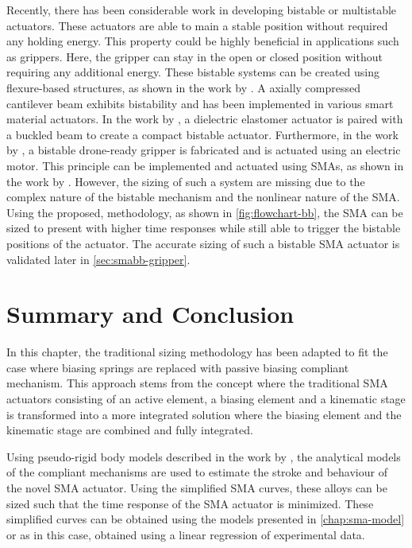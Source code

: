 Recently, there has been considerable work in developing bistable or multistable actuators. These actuators are able to main a stable position without required any holding energy. This property could be highly beneficial in applications such as grippers. Here, the gripper can stay in the open or closed position without requiring any additional energy. These bistable systems can be created using flexure-based structures, as shown in the work by \cite{jinqiuCurvedbeamBistableMechanism2004}. A axially compressed cantilever beam exhibits bistability and has been implemented in various smart material actuators. In the work by \cite{chouinardBistableAntagonisticDielectric2012}, a dielectric elastomer actuator is paired with a buckled beam to create a compact bistable actuator. Furthermore, in the work by \cite{zhangCompliantBistableGrippers2020}, a bistable drone-ready gripper is fabricated and is actuated using an electric motor. This principle can be implemented and actuated using SMAs, as shown in the work by \cite{welschVacuumGripperSystem2018}. However, the sizing of such a system are missing due to the complex nature of the bistable mechanism and the nonlinear nature of the SMA. Using the proposed, methodology, as shown in \cref{fig:flowchart-bb}, the SMA can be sized to present with higher time responses while still able to trigger the bistable positions of the actuator. The accurate sizing of such a bistable SMA actuator is validated later in \cref{sec:smabb-gripper}.



\section{Summary and Conclusion}
In this chapter, the traditional sizing methodology has been adapted to fit the case where biasing springs are replaced with passive biasing compliant mechanism. This approach stems from the concept where the traditional SMA actuators consisting of an active element, a biasing element and a kinematic stage is transformed into a more integrated solution where the biasing element and the kinematic stage are combined and fully integrated.

Using pseudo-rigid body models described in the work by \cite{heneinConceptionStructuresArticulees2005}, the analytical models of the compliant mechanisms are used to estimate the stroke and behaviour of the novel SMA actuator. Using the simplified SMA curves, these alloys can be sized such that the time response of the SMA actuator is minimized. These simplified curves can be obtained using the models presented in \cref{chap:sma-model} or as in this case, obtained using a linear regression of experimental data.

